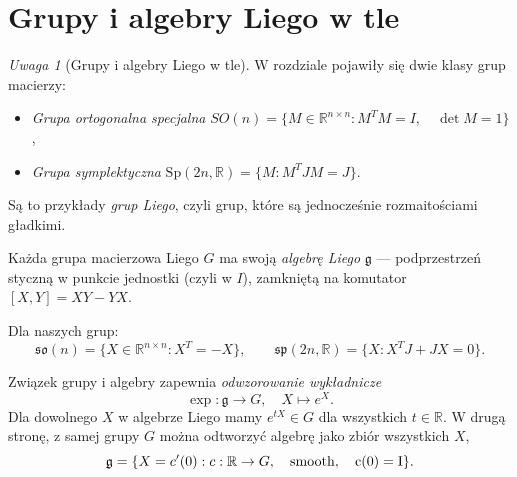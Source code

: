 \documentclass[12pt]{article}
\theoremstyle{plain}
\theoremstyle{remark}
\newtheorem*{remark}{Uwaga}
\newcommand{\R}{\mathbb{R}}
\begin{document}
\section{Grupy i algebry Liego w tle}
\begin{remark}[Grupy i algebry Liego w tle]
W rozdziale pojawiły się dwie klasy grup macierzy:
\begin{itemize}[itemsep=2pt]
  \item \emph{Grupa ortogonalna specjalna} $SO(n)=\{M\in\mathbb{R}^{n\times n}\colon M^TM=I,\quad \det M=1\}$,
  \item \emph{Grupa symplektyczna} $\mathrm{Sp}(2n,\R)=\{M\colon M^T J M=J\}$.
\end{itemize}
Są to przykłady \emph{grup Liego}, czyli grup, które są jednocześnie rozmaitościami gładkimi.  

Każda grupa macierzowa Liego $G$ ma swoją \emph{algebrę Liego} $\mathfrak{g}$ — podprzestrzeń styczną w punkcie jednostki (czyli w $I$), zamkniętą na komutator $[X,Y]=XY-YX$. 

Dla naszych grup:
\[
\mathfrak{so}(n)=\{X\in\R^{n\times n} : X^T=-X\}, \qquad
\mathfrak{sp}(2n,\R)=\{X : X^T J+JX=0\}.
\]

Związek grupy i algebry zapewnia \emph{odwzorowanie wykładnicze}
\[
\exp\colon \mathfrak{g}\to G, \quad X\mapsto e^X.
\]
Dla dowolnego $X$ w algebrze Liego mamy $e^{tX}\in G$ dla wszystkich $t\in\R$.  
W drugą stronę, z samej grupy $G$ można odtworzyć algebrę jako zbiór wszystkich
$X$, 
\[
\mathfrak{g}=\{X=c'(0): c:\R\to G,\quad \rm{smooth},\quad c(0)=I \}.
\] 
\end{remark}
\end{document}

